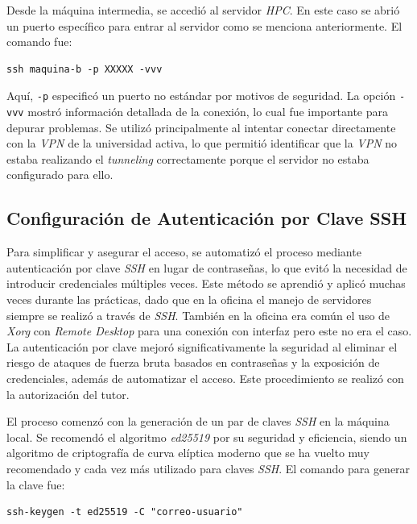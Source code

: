 Desde la máquina intermedia, se accedió al servidor \textit{HPC}. En este caso se abrió un puerto específico para entrar al servidor como se menciona anteriormente. El comando fue:
\begin{verbatim}
ssh maquina-b -p XXXXX -vvv
\end{verbatim}

Aquí, \texttt{-p} especificó un puerto no estándar por motivos de seguridad. La opción \texttt{-vvv} mostró información detallada de la conexión, lo cual fue importante para depurar problemas. Se utilizó principalmente al intentar conectar directamente con la \textit{VPN} de la universidad activa, lo que permitió identificar que la \textit{VPN} no estaba realizando el \textit{tunneling} correctamente porque el servidor no estaba configurado para ello.

\subsection*{Configuración de Autenticación por Clave SSH}
Para simplificar y asegurar el acceso, se automatizó el proceso mediante autenticación por clave \textit{SSH} en lugar de contraseñas, lo que evitó la necesidad de introducir credenciales múltiples veces. Este método se aprendió y aplicó muchas veces durante las prácticas, dado que en la oficina el manejo de servidores siempre se realizó a través de \textit{SSH}. También en la oficina era común el uso de \textit{Xorg} con \textit{Remote Desktop} para una conexión con interfaz pero este no era el caso. La autenticación por clave mejoró significativamente la seguridad al eliminar el riesgo de ataques de fuerza bruta basados en contraseñas y la exposición de credenciales, además de automatizar el acceso. Este procedimiento se realizó con la autorización del tutor.

El proceso comenzó con la generación de un par de claves \textit{SSH} en la máquina local. Se recomendó el algoritmo \textit{ed25519} por su seguridad y eficiencia, siendo un algoritmo de criptografía de curva elíptica moderno que se ha vuelto muy recomendado y cada vez más utilizado para claves \textit{SSH}. El comando para generar la clave fue:
\begin{verbatim}
ssh-keygen -t ed25519 -C "correo-usuario"
\end{verbatim}

